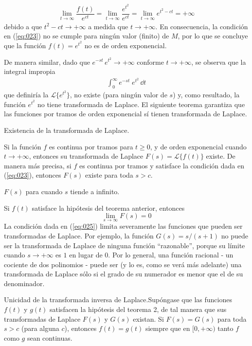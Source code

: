 \begin{align*}
\lim_{t \to \infty} \dfrac{f(t)}{e^{ct}} = \lim_{t \to \infty} \dfrac{e^{t^{2}}}{e^{ct}} = \lim_{t \to \infty} e^{t^{2}-ct} = + \infty
\end{align*}
debido a que $t^{2} - ct \to + \infty$ a medida que $t \to + \infty$. En consecuencia, la condición en (\ref{eq:023}) no se cumple para ningún valor (finito) de $M$, por lo que se concluye que la función $f(t) = e^{t^{2}}$ no es de orden exponencial.
\par
De manera similar, dado que $e^{-st} \, e^{t^{2}} \to + \infty$ conforme $t \to + \infty$, se observa que la integral impropia
\begin{align*}
\int_{0}^{\infty} e^{-st} \; e^{t^{2}} \, \dd{t}
\end{align*}
que definiría la $\mathscr{L} \{ e^{t^{2}} \}$, no existe (para ningún valor de $s$) y, como resultado, la función $e^{t^{2}}$ no tiene transformada de Laplace. El siguiente teorema garantiza que las funciones por tramos de orden exponencial sí tienen transformada de Laplace.
\begin{teo}{Existencia de la transformada de Laplace.}

 Si la función $f$ es continua por tramos para $t \geq 0$, y de orden exponencial cuando $t \to +\infty$, entonces su transformada de Laplace $F(s) = \mathscr{L} \{ f(t) \}$ existe. De manera más precisa, si $f$ es continua por tramos y satisface la condición dada en (\ref{eq:023}), entonces $F(s)$ existe para toda $s > c$.
\end{teo}
\begin{cor}{$F(s)$ para cuando $s$ tiende a infinito.}

Si $f(t)$ satisface la hipótesis del teorema anterior, entonces
\begin{equation}
\lim_{s \to \infty} F(s) = 0
\label{eq:025}
\end{equation}
La condición dada en (\ref{eq:025}) limita severamente las funciones que pueden ser transformadas de Laplace. Por ejemplo, la función $G(s) = s / (s + 1)$ no puede ser la transformada de Laplace de ninguna función \enquote{razonable}, porque su límite cuando $s \to +\infty$ es $1$ en lugar de $0$. Por lo general, una función racional - un cociente de dos polinomios - puede ser (y lo es, como se verá más adelante) una transformada de Laplace sólo si el grado de su numerador es menor que el de su denominador.
\end{cor}
\begin{teo}{Unicidad de la transformada inversa de Laplace.}Supóngase que las funciones $f(t)$ y $g(t)$ satisfacen la hipótesis del teorema 2, de tal manera que sus transformadas de Laplace $F(s)$ y $G(s)$ existan. Si $F(s) = G(s)$ para toda $s > c$ (para alguna $c$), entonces $f(t) = g(t)$ siempre que en $[0, + \infty)$ tanto $f$ como $g$ sean continuas.
\end{teo}
